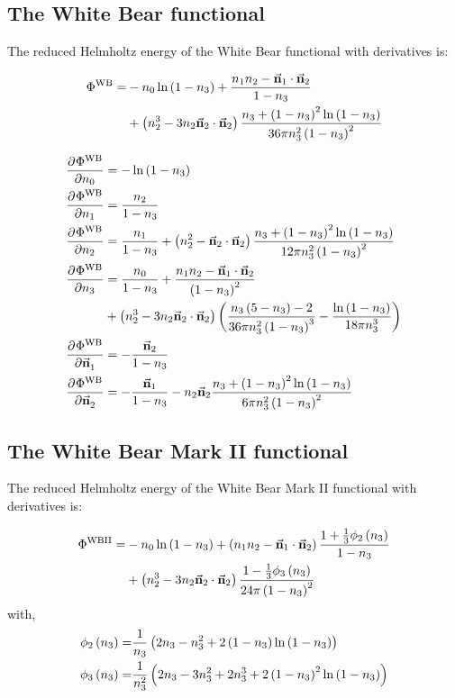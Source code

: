 \documentclass[12pt, letterpaper]{article}
\newcommand*{\pd}[3][]{\frac{\partial^{#1}#2}{\partial{#3}^{#1}}}%
\newcommand*{\vc}[1]{\vec{\mathbf{#1}}}%
\newcommand*{\lb}{\ensuremath{\left(}}
\newcommand*{\rb}{\ensuremath{\right)}}
\newcommand{\WB}{\ensuremath{\text{WB}}\xspace}
\newcommand{\WBII}{\ensuremath{\text{WBII}}\xspace}
\begin{document}


\subsection{The White Bear functional}
\label{sec:fmt2}
The reduced Helmholtz energy of the White Bear functional with derivatives is:

\begin{align}
  \Phi^\WB =& -n_0 \ln \lb 1 - n_3 \rb +
              \frac{n_1 n_2 - \vc{n}_1 \cdot \vc{n}_2}{1 - n_3}\nonumber \\
  &+ \lb n_2^3 - 3 n_2 \vc{n}_2 \cdot \vc{n}_2 \rb \frac{ n_3 + \lb 1 - n_3 \rb ^2 \ln \lb 1 - n_3 \rb}{36\pi n_3^2 \lb 1 - n_3 \rb^2}
\end{align}

\begin{align}
  \pd{\Phi^\WB}{n_0} &= -\ln \lb 1 - n_3 \rb \\
  \pd{\Phi^\WB}{n_1} &= \frac{n_2}{1 - n_3} \\
  \pd{\Phi^\WB}{n_2} &= \frac{n_1}{1 - n_3} + \lb n_2^2 - \vc{n}_2 \cdot \vc{n}_2 \rb \frac{ n_3 + \lb 1 - n_3 \rb ^2 \ln \lb 1 - n_3 \rb}{12\pi n_3^2 \lb 1 - n_3 \rb^2} \\
  \pd{\Phi^\WB}{n_3} &= \frac{n_0}{1 - n_3} +
  \frac{n_1 n_2 - \vc{n}_1 \cdot \vc{n}_2}{\lb 1 - n_3 \rb^2} \nonumber \\
  & + \lb n_2^3 - 3 n_2 \vc{n}_2 \cdot \vc{n}_2 \rb \biggl( \frac{n_3 \lb 5 - n_3 \rb - 2}{36\pi n_3^2 \lb 1 - n_3 \rb^3} - \frac{\ln \lb 1 - n_3 \rb}{18\pi n_3^3} \biggr) \\
  \pd{\Phi^\WB}{\vc{n}_1} &=  - \frac{\vc{n}_2}{1 - n_3} \\
  \pd{\Phi^\WB}{\vc{n}_2} &=  -\frac{\vc{n}_1}{1 - n_3} - n_2 \vc{n}_2 \frac{ n_3 + \lb 1 - n_3 \rb ^2 \ln \lb 1 - n_3 \rb}{6\pi n_3^2 \lb 1 - n_3 \rb^2}
\end{align}

\subsection{The White Bear Mark II functional}
\label{sec:fmt2}
The reduced Helmholtz energy of the White Bear Mark II functional with derivatives is:

\begin{align}
  \Phi^\WBII =& -n_0 \ln \lb 1 - n_3 \rb +
  \lb n_1 n_2 - \vc{n}_1 \cdot \vc{n}_2 \rb \frac{1 + \frac{1}{3} \phi_2\lb n_3 \rb}{1 - n_3} \nonumber \\
  &+ \lb n_2^3 - 3 n_2 \vc{n}_2 \cdot \vc{n}_2 \rb\frac{ 1 - \frac{1}{3} \phi_3\lb n_3 \rb }{24\pi \lb 1 - n_3 \rb^2}
\end{align}
with,
\begin{align}
  \phi_2\lb n_3 \rb =& \frac{1}{n_3}\lb 2 n_3 - n_3^2 + 2\lb 1-n_3 \rb\ln \lb 1 - n_3 \rb \rb \\
  \phi_3\lb n_3 \rb =& \frac{1}{n_3^2}\lb 2 n_3 - 3n_3^2 + 2n_3^3 + 2\lb 1-n_3 \rb^2\ln \lb 1 - n_3 \rb \rb
\end{align}
\end{document}
